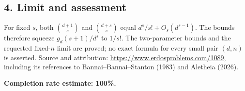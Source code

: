\subsection*{4. Limit and assessment}
For fixed $s$, both $\binom{d+1}{s}$ and $\binom{d+s}{s}$ equal $d^s/s!+O_s(d^{s-1})$. The bounds therefore squeeze $g_d(s+1)/d^s$ to $1/s!$. The two-parameter bounds and the requested fixed-$n$ limit are proved; no exact formula for every small pair $(d,n)$ is asserted.
Source and attribution: \url{https://www.erdosproblems.com/1089}, including its references to Bannai--Bannai--Stanton (1983) and Aletheia (2026).

\textbf{Completion rate estimate: 100\%.}
